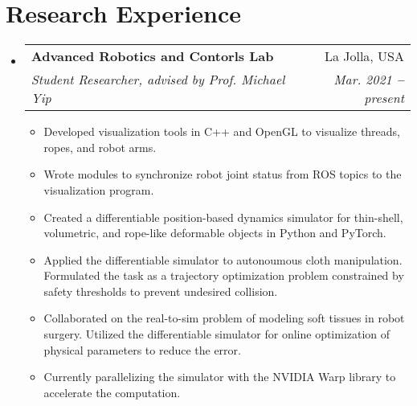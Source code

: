\documentclass[letterpaper,11pt]{article}
\makeatletter
\newcommand{\resumeItem}[1]{
    \item\small{
        {#1 \vspace{-1.5pt}}
    }
}
\newcommand{\resumeSubheading}[4]{
    \vspace{-2pt}\item
    \begin{tabular*}{0.97\textwidth}[t]{l@{\extracolsep{\fill}}r}
    \textbf{#1} & #2 \\
    \textit{\small #3} & \textit{\small #4} \\
    \end{tabular*}\vspace{-7pt}
}
\newcommand{\resumeSubHeadingListStart}{\begin{itemize}[leftmargin=0in, label={}]}
\newcommand{\resumeSubHeadingListEnd}{\end{itemize}}
\newcommand{\resumeItemListStart}{\begin{itemize}}
\newcommand{\resumeItemListEnd}{\end{itemize}\vspace{-7pt}}
\makeatother
\begin{document}

\section{Research Experience}
    \vspace{3pt}
    \resumeSubHeadingListStart
        \resumeSubheading{Advanced Robotics and Contorls Lab}
        {La Jolla, USA}
        {Student Researcher, advised by Prof. Michael Yip}
        {Mar. 2021 \textbf{--} present}
        \resumeItemListStart
            \resumeItem{
                Developed visualization tools in C++ and OpenGL to visualize threads, ropes, and robot arms.
            }
            \resumeItem{
                Wrote modules to synchronize robot joint status from ROS topics to the visualization program.
            }
            \resumeItem{
                Created a differentiable position-based dynamics simulator for thin-shell, volumetric, and rope-like deformable objects in Python and PyTorch.
            }
            \resumeItem{
                Applied the differentiable simulator to autonoumous cloth manipulation. Formulated the task as a trajectory optimization problem constrained by safety thresholds to prevent undesired collision.
            }
            \resumeItem{
                Collaborated on the real-to-sim problem of modeling soft tissues in robot surgery. Utilized the differentiable simulator for online optimization of physical parameters to reduce the error.
            }
            \resumeItem{
                Currently parallelizing the simulator with the NVIDIA Warp library to accelerate the computation.
            }
        \resumeItemListEnd
    \resumeSubHeadingListEnd



\end{document}
